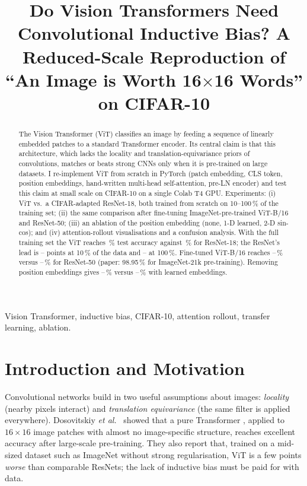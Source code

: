 \documentclass[conference]{IEEEtran}
\title{Do Vision Transformers Need Convolutional Inductive Bias? A Reduced-Scale Reproduction of ``An Image is Worth 16$\times$16 Words'' on CIFAR-10}
\author{
\IEEEauthorblockN{Aditya Kumar Jha}
\IEEEauthorblockA{B.Tech CSE, RGIPT --- Course 24CS3006, Deep Learning 2026 (paper project DL-065)\\
Email: [add institutional email if required]}
}
\newif\ifdraft \drafttrue
\newcommand{\verify}[1]{\ifdraft{\color{red}#1}\else#1\fi}
\newcommand{\gapTen}{--}\newcommand{\gapTwentyFive}{--}\newcommand{\gapFifty}{--}\newcommand{\gapFull}{--}
\newcommand{\accAblNone}{--}\newcommand{\accAblLearned}{--}\newcommand{\accAblSincos}{--}\newcommand{\accAblMean}{--}
\newcommand{\accFtVit}{--}\newcommand{\accFtRes}{--}\newcommand{\epochsFt}{--}
\begin{document}
\maketitle

\begin{abstract}
The Vision Transformer (ViT) classifies an image by feeding a sequence of linearly embedded patches to a standard Transformer encoder. Its central claim is that this architecture, which lacks the locality and translation-equivariance priors of convolutions, matches or beats strong CNNs only when it is pre-trained on large datasets. I re-implement ViT from scratch in PyTorch (patch embedding, CLS token, position embeddings, hand-written multi-head self-attention, pre-LN encoder) and test this claim at small scale on CIFAR-10 on a single Colab T4 GPU. Experiments: (i) ViT vs.\ a CIFAR-adapted ResNet-18, both trained from scratch on 10--100\,\% of the training set; (ii) the same comparison after fine-tuning ImageNet-pre-trained ViT-B/16 and ResNet-50; (iii) an ablation of the position embedding (none, 1-D learned, 2-D sin-cos); and (iv) attention-rollout visualisations and a confusion analysis. \verify{With the full training set the ViT reaches \accVitFull\,\% test accuracy against \accResFull\,\% for ResNet-18; the ResNet's lead is \gapTen{} points at 10\,\% of the data and \gapFull{} at 100\,\%. Fine-tuned ViT-B/16 reaches \accFtVit\,\% versus \accFtRes\,\% for ResNet-50 (paper: 98.95\,\% for ImageNet-21k pre-training). Removing position embeddings gives \accAblNone\,\% versus \accAblLearned\,\% with learned embeddings.}
\end{abstract}

\begin{IEEEkeywords}
Vision Transformer, inductive bias, CIFAR-10, attention rollout, transfer learning, ablation.
\end{IEEEkeywords}

\section{Introduction and Motivation}
Convolutional networks build in two useful assumptions about images: \emph{locality} (nearby pixels interact) and \emph{translation equivariance} (the same filter is applied everywhere). Dosovitskiy \emph{et al.}\ \cite{dosovitskiy2021} showed that a pure Transformer \cite{vaswani2017}, applied to $16\times16$ image patches with almost no image-specific structure, reaches excellent accuracy after large-scale pre-training. They also report that, trained on a mid-sized dataset such as ImageNet without strong regularisation, ViT is a few points \emph{worse} than comparable ResNets; the lack of inductive bias must be paid for with data.
\end{document}
